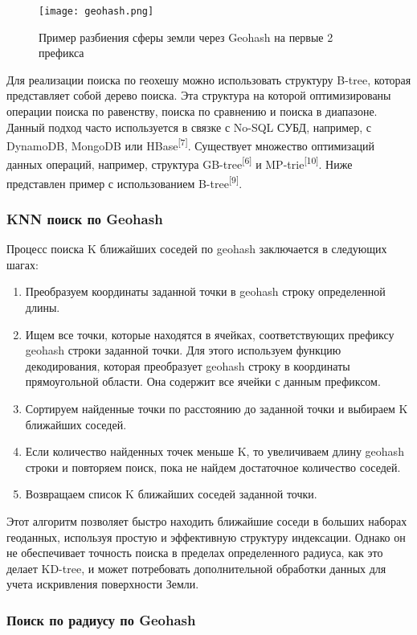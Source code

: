 \begin{figure}[h]
    \centering
    \texttt{[image: geohash.png]}
    \caption{Пример разбиения сферы земли через Geohash на первые 2 префикса}
\end{figure}

Для реализации поиска по геохешу можно использовать структуру B-tree, которая представляет собой дерево поиска. Эта структура на которой оптимизированы операции поиска по равенству, поиска по сравнению и поиска в диапазоне. Данный подход часто используется в связке с No-SQL СУБД, например, с DynamoDB, MongoDB или HBase\textsuperscript{[7]}.
Существует множество оптимизаций данных операций, например, структура GB-tree\textsuperscript{[6]} и MP-trie\textsuperscript{[10]}.
Ниже представлен пример с использованием B-tree\textsuperscript{[9]}.

\subsubsection{KNN поиск по Geohash}
Процесс поиска K ближайших соседей по geohash заключается в следующих шагах:
\begin{enumerate}
    \item Преобразуем координаты заданной точки в geohash строку определенной длины.
    \item Ищем все точки, которые находятся в ячейках, соответствующих префиксу geohash строки заданной точки. Для этого используем функцию декодирования, которая преобразует geohash строку в координаты прямоугольной области. Она содержит все ячейки с данным префиксом.
    \item Сортируем найденные точки по расстоянию до заданной точки и выбираем K ближайших соседей.
    \item Если количество найденных точек меньше K, то увеличиваем длину geohash строки и повторяем поиск, пока не найдем достаточное количество соседей.
    \item Возвращаем список K ближайших соседей заданной точки.
\end{enumerate}

Этот алгоритм позволяет быстро находить ближайшие соседи в больших наборах геоданных, используя простую и эффективную структуру индексации. Однако он не обеспечивает точность поиска в пределах определенного радиуса, как это делает KD-tree, и может потребовать дополнительной обработки данных для учета искривления поверхности Земли.

\subsubsection{Поиск по радиусу по Geohash}

